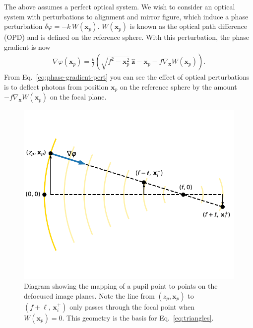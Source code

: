 \documentclass[TS,authoryear,toc]{lsstdoc}
\begin{document}
The above assumes a perfect optical system.
We wish to consider an optical system with perturbations to alignment and mirror figure, which induce a phase perturbation $\delta \varphi = -k \, W(\mathbf{x}_p)$. $W(\mathbf{x}_p)$ is known as the optical path difference (OPD) and is defined on the reference sphere.
With this perturbation, the phase gradient is now
\begin{align}
    \nabla \varphi(\mathbf{x}_p)
    = \frac{k}{f} \left(\sqrt{f^2 - \mathbf{x}_p^2} ~ \hat{\mathbf{z}} -\mathbf{x}_p - f \nabla_\mathbf{x} W(\mathbf{x}_p) \right).
    \label{eq:phase-gradient-pert}
\end{align}
From Eq.~\ref{eq:phase-gradient-pert} you can see the effect of optical perturbations is to deflect photons from position $\mathbf{x}_p$ on the reference sphere by the amount $-f \nabla_\mathbf{x} W(\mathbf{x}_p)$ on the focal plane.

\begin{figure}[t]
    \centering
    \includegraphics[width=0.6\linewidth]{figures/similar_triangles.pdf}
    \caption{
        Diagram showing the mapping of a pupil point to points on the defocused image planes.
        Note the line from $(z_p, \mathbf{x}_p)$ to $(f + \ell, \, \mathbf{x}_i^+)$ only passes through the focal point when $W(\mathbf{x}_p) = 0$.
        This geometry is the basis for Eq.~\ref{eq:triangles}.
    }
    \label{fig:triangles}
\end{figure}
\end{document}
